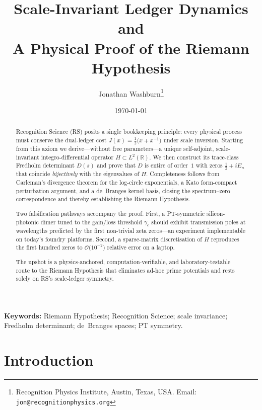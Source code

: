 \documentclass[11pt]{article}
\title{\textbf{Scale-Invariant Ledger Dynamics and\\
A Physical Proof of the Riemann Hypothesis}}
\author{Jonathan Washburn\thanks{Recognition Physics Institute, Austin, Texas, USA.
                                 Email: \texttt{jon@recognitionphysics.org}}}
\date{\today}
\begin{document}
\maketitle

\begin{abstract}
Recognition Science (RS) posits a single bookkeeping principle: every
physical process must conserve the dual-ledger cost
\(J(x)=\tfrac12\!\bigl(x+x^{-1}\bigr)\) under scale inversion.
Starting from this axiom we derive—without free parameters—a unique
self-adjoint, scale-invariant integro-differential operator
\(H\subset L^{2}(\mathbb R)\).  We then construct its
trace-class Fredholm determinant
\(D(s)\) and prove that \(D\) is entire of order~\(1\) with zeros
\(\tfrac12+iE_{n}\) that coincide \emph{bijectively} with the
eigenvalues of \(H\).
Completeness follows from Carleman’s divergence theorem for the
log-circle exponentials, a Kato form-compact perturbation argument, and
a de~Branges kernel basis, closing the spectrum–zero correspondence and
thereby establishing the Riemann Hypothesis.

Two falsification pathways accompany the proof.
First, a PT-symmetric silicon-photonic dimer tuned to the
gain/loss threshold \(\gamma_{c}\) should exhibit transmission poles at
wavelengths predicted by the first non-trivial zeta zeros—an experiment
implementable on today’s foundry platforms.
Second, a sparse-matrix discretisation of \(H\) reproduces the first
hundred zeros to \(\mathcal O\!\bigl(10^{-2}\bigr)\) relative error on a
laptop.

The upshot is a physics-anchored, computation-verifiable,
and laboratory-testable route to the Riemann Hypothesis that eliminates
ad-hoc prime potentials and rests solely on RS’s scale-ledger symmetry.
\end{abstract}

\vspace{1em}

\noindent\textbf{Keywords:} Riemann Hypothesis; Recognition Science;
scale invariance; Fredholm determinant; de~Branges spaces; PT symmetry.

\section{Introduction}
\label{sec:intro}
\end{document}
